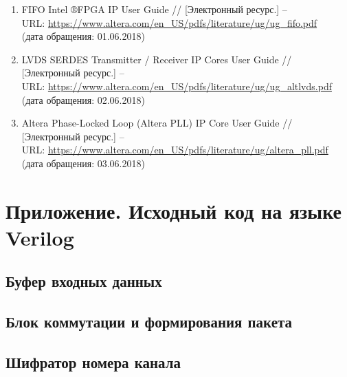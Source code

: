 \begin{enumerate}
	\item FIFO Intel ®FPGA IP User Guide // [Электронный ресурс.] --\\
	URL: \href{https://www.altera.com/en_US/pdfs/literature/ug/ug_fifo.pdf}{https://www.altera.com/en\_US/pdfs/literature/ug/ug\_fifo.pdf}\\
	(дата обращения: 01.06.2018)
	\item LVDS SERDES Transmitter / Receiver IP Cores User Guide // [Электронный ресурс.] --\\
	URL: \href{https://www.altera.com/en_US/pdfs/literature/ug/ug_altlvds.pdf}{https://www.altera.com/en\_US/pdfs/literature/ug/ug\_altlvds.pdf}\\
	(дата обращения: 02.06.2018)
	\item Altera Phase-Locked Loop (Altera PLL) IP Core User Guide // [Электронный ресурс.] --\\
	URL: \href{https://www.altera.com/en_US/pdfs/literature/ug/altera_pll.pdf}{https://www.altera.com/en\_US/pdfs/literature/ug/altera\_pll.pdf}\\
	(дата обращения: 03.06.2018)
\end{enumerate}

\newpage

\section*{Приложение. Исходный код на языке Verilog}

\subsection*{Буфер входных данных}



\subsection*{Блок коммутации и формирования пакета}



\newpage

\subsection*{Шифратор номера канала}

